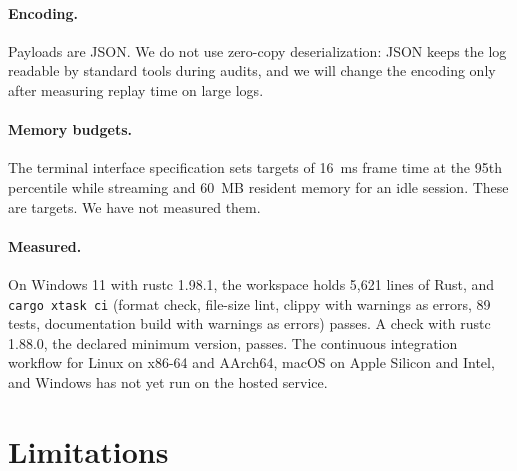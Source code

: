 \documentclass[11pt,a4paper]{article}
\begin{document}
\paragraph{Encoding.} Payloads are JSON. We do not use zero-copy deserialization: JSON keeps the log readable by standard tools during audits, and we will change the encoding only after measuring replay time on large logs.

\paragraph{Memory budgets.} The terminal interface specification sets targets of 16~ms frame time at the 95th percentile while streaming and 60~MB resident memory for an idle session. These are targets. We have not measured them.

\paragraph{Measured.} On Windows 11 with rustc 1.98.1, the workspace holds 5{,}621 lines of Rust, and \texttt{cargo xtask ci} (format check, file-size lint, clippy with warnings as errors, 89 tests, documentation build with warnings as errors) passes. A check with rustc 1.88.0, the declared minimum version, passes. The continuous integration workflow for Linux on x86-64 and AArch64, macOS on Apple Silicon and Intel, and Windows has not yet run on the hosted service.

\section{Limitations}
\label{sec:limits}
\end{document}
